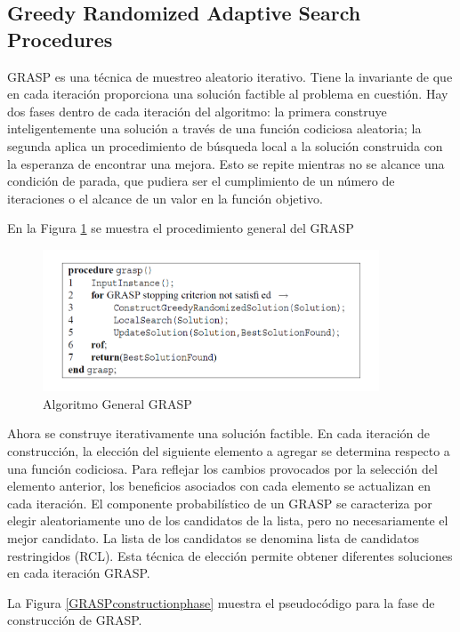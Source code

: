 \documentclass[a4paper,12pt]{book}
\begin{document}
		\subsection{Greedy Randomized Adaptive Search Procedures} \label{sub:GRASP}
		GRASP \cite{GRASP} es una técnica de muestreo aleatorio iterativo. Tiene la invariante de que en cada iteración proporciona una solución factible al problema en cuestión. Hay dos fases dentro de cada iteración del algoritmo: la primera construye inteligentemente una solución a través de una función codiciosa aleatoria; la segunda aplica un procedimiento de búsqueda local a la solución construida con la esperanza de encontrar una mejora. Esto se repite mientras no se alcance una condición de parada, que pudiera ser el cumplimiento de un número de iteraciones o el alcance de un valor en la función objetivo.
		
		En la Figura \ref{GRASPgeneral} se muestra el procedimiento general del GRASP
		
		\begin{figure}[h]
			\centering
			\includegraphics[width=10cm]{./Graphics/GRASPgeneral.png}
			\caption{Algoritmo General GRASP}
			\label{GRASPgeneral}
		\end{figure}
		
		Ahora se construye iterativamente una solución factible. En cada iteración de construcción, la elección del siguiente elemento a agregar se determina respecto a una función codiciosa. Para reflejar los cambios provocados por la selección del elemento anterior, los beneficios asociados con cada elemento se actualizan en cada iteración. El componente probabilístico de un GRASP se caracteriza por elegir aleatoriamente uno de los candidatos de la lista, pero no necesariamente el mejor candidato. La lista de los candidatos se denomina lista de candidatos restringidos (RCL). Esta técnica de elección permite obtener diferentes soluciones en cada iteración GRASP.
		
		La Figura \ref{GRASPconstructionphase} muestra el pseudocódigo para la fase de construcción de GRASP.
	
\end{document}
